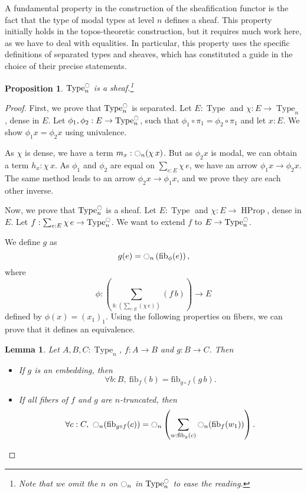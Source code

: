 \documentclass[conference]{IEEEtran}
\newtheorem{prop}[thm]{Proposition}
\newtheorem{lem}[thm]{Lemma}
\DeclareMathOperator{\Type}{Type}
\DeclareMathOperator{\HProp}{HProp}
\newcommand{\modal}{\ensuremath{\ocircle}}
\newcommand \fib[2] {\mathrm{fib}_{#1}(#2)}
\begin{document}
A fundamental property in the construction of the sheafification
functor is the fact that the type of modal types at level $n$ defines
a sheaf.
%
This property initially holds in the topos-theoretic construction, but
it requires much work here, as we have to deal with equalities. In
particular, this property uses the specific definitions
of separated types and sheaves, which has constituted a guide in the
choice of their precise statements. 

\begin{prop}\label{prop:sheaf-is-sheaf}
  $\Type_n^\modal$ is a sheaf.\footnote{Note that we omit the $n$
on $\modal_n$ in $\Type_n^\modal$ to ease the reading.}
\end{prop}
\begin{proof}
  First, we prove that $\Type_n^\modal$ is separated. Let $E:\Type$
  and $\chi:E \to \Type_n$, dense in $E$. Let $\phi_1,\phi_2:E \to
  \Type_n^\modal$, such that $\phi_1 \circ \pi_1 = \phi_2 \circ
  \pi_1$ and let $x:E$. We show $\phi_1 x = \phi_2 x$ using
  univalence.

  As $\chi$ is dense, we have a term $m_x : \modal_n(\chi\, x)$.
  But as $\phi_2 x$ is modal, we can obtain a term $h_x : \chi\,
  x$. 
  As $\phi_1$ and $\phi_2$ are equal on $\sum_{e:E}\chi\, e$, we
  have an arrow $\phi_1 x \to \phi_2 x$.
  The same method leads to an arrow $\phi_2 x \to \phi_1 x$, and we
  prove they are each other inverse.

  Now, we prove that $\Type_n^\modal$ is a sheaf. Let $E:\Type$ and
  $\chi:E \to \HProp$, dense in $E$. Let $f:\sum_{e:E} \chi\, e \to
  \Type_n^\modal$. We want to extend $f$ to $E \to \Type_n^\modal$.

  We define $g$ as 
  $$g(e) = \modal_n \left( \fib \phi e \right), $$
  where
  $$\phi : \left(\sum_{b:\left(\sum_{e:E} (\chi\, e)\right)} (f\,
    b)\right) \to E$$
  defined by $\phi(x) = (x_1)_1$.
  Using the following properties on fibers, we can prove that it
  defines an equivalence.
  \begin{lem}
    Let $A,B,C:\Type_n$, $f:A\to B$ and $g:B\to C$.
    Then
    \begin{itemize}
    \item If $g$ is an embedding, then 
      $$\forall b:B,~\fib f b = \fib {g\circ f} {g\, b}.$$
    \item If all fibers of $f$ and $g$ are $n$-truncated, then
      $$\forall c:C,~\modal_n(\fib {g \circ f} c) =
      \modal_n \left(  
        \sum_{w:\fib g c} \modal_n (\fib f {w_1})
      \right).$$
    \end{itemize}
  \end{lem}

\end{proof}
\end{document}
